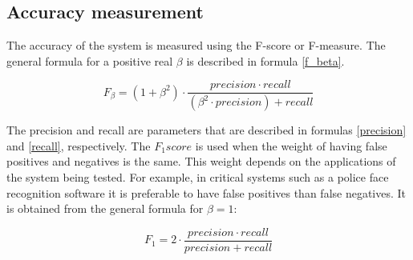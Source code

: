 
		\subsection{Accuracy measurement}
		\label{accuracy_measurement}

		The accuracy of the system is measured using the F-score or F-measure. 
		The general formula for a positive real $\beta$ is described in formula \ref{f_beta}. 
		\begin{center}
		\begin{equation}
		\label{f_beta}
		F_\beta=(1+\beta^2)\cdot\frac{precision \cdot recall}{(\beta^2 \cdot precision )+recall}
		\end{equation}
		\end{center}

		The precision and recall are parameters that are described in formulas \ref{precision} and \ref{recall}, respectively. 
		The $F_1 score$ is used when the weight of having false positives and negatives is the same. 
		This weight depends on the applications of the system being tested. 
		For example, in critical systems such as a police face recognition software it is preferable to have false positives than false negatives. 
		It is obtained from the general formula for $\beta=1$: 	
		
		\begin{center}
		\begin{equation}
		F_1=2\cdot\frac{precision \cdot recall}{precision + recall}
		\end{equation}
		\end{center}

